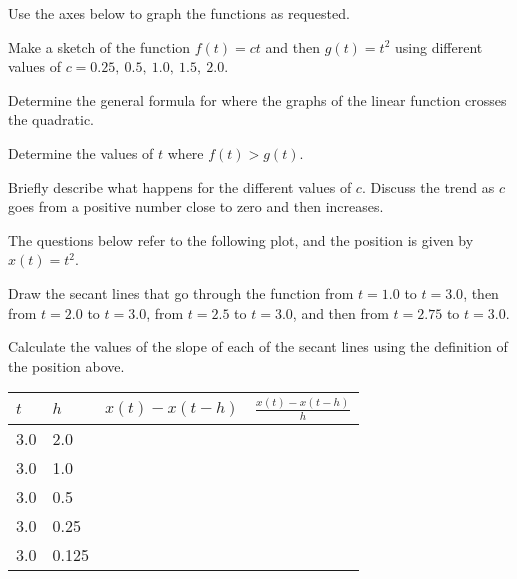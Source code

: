 \begin{problem}
\item Use the axes below to graph the functions as requested.

  \scalebox{0.7}{}

  \begin{subproblem}
  \item Make a sketch of the function $f(t)=c t$ and then $g(t)=t^2$
    using different values of $c=0.25,~0.5,~1.0,~1.5,~2.0$.
  \item Determine the general formula for where the graphs of the
    linear function crosses the quadratic.
    \vfill
  \item Determine the values of $t$ where $f(t)>g(t)$. 
    \vfill
    \clearpage
  \item Briefly describe what happens for the different values of
    $c$. Discuss the trend as $c$ goes from a positive number close to
    zero and then increases.
    \vfill
  \end{subproblem}

  \clearpage

\item The questions below refer to the following plot, and the
  position is given by $x(t)=t^2$.

  \scalebox{0.7}{}

  \begin{subproblem}
    \item Draw the secant lines that go through the function from
      $t=1.0$ to $t=3.0$, then from $t=2.0$ to $t=3.0$, from
      $t=2.5$ to $t=3.0$, and then from $t=2.75$ to $t=3.0$.
    \item Calculate the values of the slope of each of the secant
      lines using the definition of the position above.

      \begin{tabular}{l|l|l|l}
        $t$ & $h$   & $x(t)-x(t-h)$ & $\frac{x(t)-x(t-h)}{h}$ \\ \hline
        3.0 & 2.0   & & \\ [15pt]
        3.0 & 1.0   & & \\ [15pt]
        3.0 & 0.5   & & \\ [15pt]
        3.0 & 0.25  & & \\ [15pt]
        3.0 & 0.125 & & \\ [15pt]
      \end{tabular}


\end{subproblem}
\end{problem}

